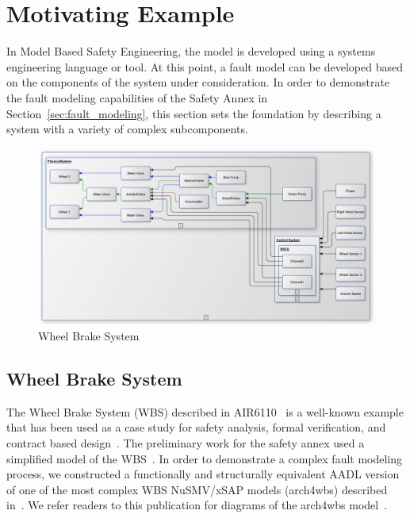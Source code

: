  \section{Motivating Example}
\label{sec:case_study} 
In Model Based Safety Engineering, the model is developed using a systems engineering language or tool. At this point, a fault model can be developed based on the components of the system under consideration. In order to demonstrate the fault modeling capabilities of the Safety Annex in Section~\ref{sec:fault_modeling}, this section sets the foundation by describing a system with a variety of complex subcomponents. 

\begin{figure}[h!]
	\centering
	\includegraphics[trim=0 9 0 5,clip,width=\textwidth]{images/wbs_arch.pdf}
	\caption{Wheel Brake System}
	\label{fig:wbs}
\end{figure} 

\subsection{Wheel Brake System}
The Wheel Brake System (WBS) described in AIR6110~\cite{AIR6110} is a well-known example that has been used as a case study for safety analysis, formal verification, and contract based design~\cite{DBLP:conf/cav/BozzanoCPJKPRT15, 10.1007/978-3-319-11936-6-7, CAV2015:BoCiGrMa, Joshi05:SafeComp}. The preliminary work for the safety annex used a simplified model of the WBS~\cite{Stewart17:IMBSA}. In order to demonstrate a complex fault modeling process, we constructed a functionally and structurally equivalent AADL version of one of the most complex WBS NuSMV/xSAP models (arch4wbs) described in~\cite{DBLP:conf/cav/BozzanoCPJKPRT15}. We refer readers to this publication for diagrams of the arch4wbs model~\cite{DBLP:conf/cav/BozzanoCPJKPRT15}.   

